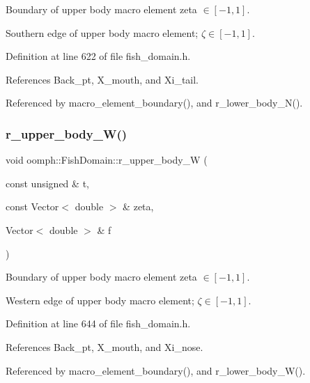 Boundary of upper body macro element zeta $ \in [-1,1] $. 

Southern edge of upper body macro element; $ \zeta \in [-1,1] $. 

Definition at line 622 of file fish\+\_\+domain.\+h.



References Back\+\_\+pt, X\+\_\+mouth, and Xi\+\_\+tail.



Referenced by macro\+\_\+element\+\_\+boundary(), and r\+\_\+lower\+\_\+body\+\_\+\+N().

\mbox{\label{classoomph_1_1FishDomain_ac0fadb2212e194bfe9f2ff7f0c892c22}} 
\subsubsection{\texorpdfstring{r\+\_\+upper\+\_\+body\+\_\+\+W()}{r\_upper\_body\_W()}}
{\footnotesize\ttfamily void oomph\+::\+Fish\+Domain\+::r\+\_\+upper\+\_\+body\+\_\+W (\begin{DoxyParamCaption}\item[{const unsigned \&}]{t,  }\item[{const Vector$<$ double $>$ \&}]{zeta,  }\item[{Vector$<$ double $>$ \&}]{f }\end{DoxyParamCaption})\hspace{0.3cm}{\ttfamily [private]}}



Boundary of upper body macro element zeta $ \in [-1,1] $. 

Western edge of upper body macro element; $ \zeta \in [-1,1] $. 

Definition at line 644 of file fish\+\_\+domain.\+h.



References Back\+\_\+pt, X\+\_\+mouth, and Xi\+\_\+nose.



Referenced by macro\+\_\+element\+\_\+boundary(), and r\+\_\+lower\+\_\+body\+\_\+\+W().

\mbox{\label{classoomph_1_1FishDomain_a063912bd40138bb84b3cdfc23133eff2}} 
